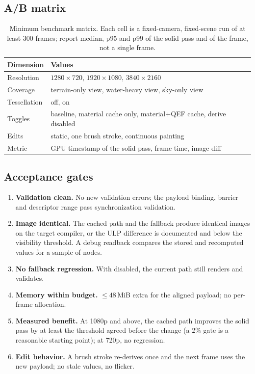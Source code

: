 \documentclass[11pt,a4paper]{article}
\newcommand{\code}[1]{\texttt{\detokenize{#1}}}
\theoremstyle{plain}
\theoremstyle{definition}
\theoremstyle{remark}
\begin{document}
\subsection{A/B matrix}

\begin{table}[H]
\centering
\small
\caption{Minimum benchmark matrix. Each cell is a fixed-camera, fixed-scene
run of at least 300 frames; report median, p95 and p99 of the solid pass and
of the frame, not a single frame.}
\label{tab:bench}
\begin{tabularx}{\linewidth}{@{}lX@{}}
\toprule
Dimension & Values \\
\midrule
Resolution & $1280\times720$, $1920\times1080$, $3840\times2160$ \\
Coverage & terrain-only view, water-heavy view, sky-only view \\
Tessellation & off, on \\
Toggles & baseline, material cache only, material+QEF cache, derive disabled \\
Edits & static, one brush stroke, continuous painting \\
Metric & GPU timestamp of the solid pass, frame time, image diff \\
\bottomrule
\end{tabularx}
\end{table}

\subsection{Acceptance gates}

\begin{enumerate}[leftmargin=1.4em,itemsep=2pt]
\item \textbf{Validation clean.} No new validation errors; the payload
      binding, barrier and descriptor range pass synchronization validation.
\item \textbf{Image identical.} The cached path and the fallback produce
      identical images on the target compiler, or the ULP difference is
      documented and below the visibility threshold. A debug readback compares
      the stored and recomputed values for a sample of nodes.
\item \textbf{No fallback regression.} With \code{OctreeDerive.comp} disabled,
      the current path still renders and validates.
\item \textbf{Memory within budget.} $\le48$\,MiB extra for the aligned
      payload; no per-frame allocation.
\item \textbf{Measured benefit.} At 1080p and above, the cached path improves
      the solid pass by at least the threshold agreed before the change
      (a 2\% gate is a reasonable starting point); at 720p, no regression.
\item \textbf{Edit behavior.} A brush stroke re-derives once and the next
      frame uses the new payload; no stale values, no flicker.
\end{enumerate}
\end{document}
